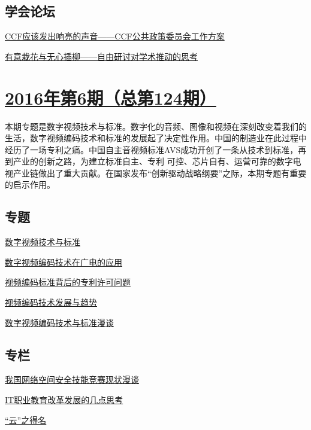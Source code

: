 \documentclass[a4paper]{article}
\begin{document}
\subsection{学会论坛}
\href{http://history.ccf.org.cn/resources/1190201776262/2016/07/12/16.pdf}{CCF应该发出响亮的声音——CCF公共政策委员会工作方案}

\href{http://history.ccf.org.cn/resources/1190201776262/2016/07/12/15.pdf}{有意栽花与无心插柳——自由研讨对学术推动的思考}


\section{\href{http://history.ccf.org.cn/sites/ccf/jsjtbbd.jsp?contentId=2931600070199}{\textbf{2016年第6期（总第124期）}}}
本期专题是数字视频技术与标准。数字化的音频、图像和视频在深刻改变着我们的生活，数字视频编码技术和标准的发展起了决定性作用。中国的制造业在此过程中经历了一场专利之痛。中国自主音视频标准AVS成功开创了一条从技术到标准，再到产业的创新之路，为建立标准自主、专利
可控、芯片自有、运营可靠的数字电视产业链做出了重大贡献。在国家发布“创新驱动战略纲要”之际，本期专题有重要的启示作用。
\subsection{专题}
\href{http://history.ccf.org.cn/resources/1190201776262/2016/06/13/1.pdf}{数字视频技术与标准}

\href{http://history.ccf.org.cn/resources/1190201776262/2016/06/13/5.pdf}{数字视频编码技术在广电的应用}

\href{http://history.ccf.org.cn/resources/1190201776262/2016/06/13/3.pdf}{视频编码标准背后的专利许可问题}

\href{http://history.ccf.org.cn/resources/1190201776262/2016/06/13/4.pdf}{视频编码技术发展与趋势}

\href{http://history.ccf.org.cn/resources/1190201776262/2016/06/13/2.pdf}{数字视频编码技术与标准漫谈}

\subsection{专栏}
\href{http://history.ccf.org.cn/resources/1190201776262/2016/06/13/9.pdf}{我国网络空间安全技能竞赛现状漫谈}

\href{http://history.ccf.org.cn/resources/1190201776262/2016/06/13/12.pdf}{IT职业教育改革发展的几点思考}

\href{http://history.ccf.org.cn/resources/1190201776262/2016/06/13/13.pdf}{“云”之得名}
\end{document}
